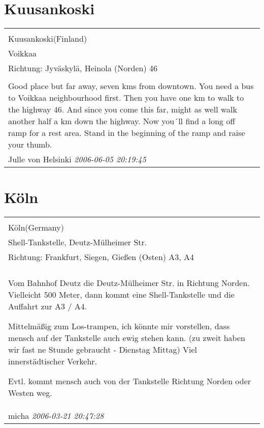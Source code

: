 \documentclass[a4paper,12pt]{article}
\begin{document}
\section{Kuusankoski}
\begin{tabular}{|p{13cm}|}
\hline\\
Kuusankoski(Finland)\\
Voikkaa\\
Richtung: Jyväskylä, Heinola (Norden) 46 \\
\hline\\
Good place but far away, seven kms from downtown. You need a bus to Voikkaa neighbourhood first. Then you have one km to walk to the highway 46. And since you come this far, might as well walk another half a km down the highway. Now you´ll find a long off ramp for a rest area. Stand in the beginning of the ramp and raise your thumb. \\
Julle von Helsinki \textit{ 2006-06-05 20:19:45 }\\\hline
\end{tabular}


\section{Köln}
\begin{tabular}{|p{13cm}|}
\hline\\
Köln(Germany)\\
Shell-Tankstelle, Deutz-Mülheimer Str.\\
Richtung: Frankfurt, Siegen, Gießen (Osten) A3, A4 \\
\hline\\
Vom Bahnhof Deutz die Deutz-Mülheimer Str. in Richtung Norden. Vielleicht 500 Meter, dann kommt eine Shell-Tankstelle und die Auffahrt zur A3 / A4.

Mittelmäßig zum Los-trampen, ich könnte mir vorstellen, dass mensch auf der Tankstelle auch ewig stehen kann. (zu zweit haben wir fast ne Stunde gebraucht - Dienstag Mittag) Viel innerstädtischer Verkehr.

Evtl. kommt mensch auch von der Tankstelle Richtung Norden oder Westen weg. \\
micha \textit{ 2006-03-21 20:47:28 }\\\hline
\end{tabular}
\end{document}
